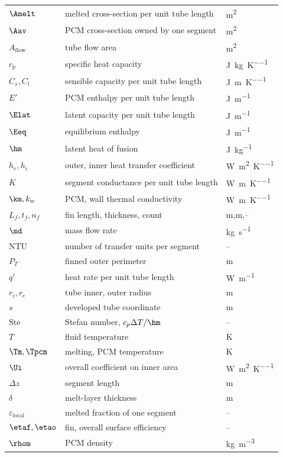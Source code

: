 \noindent
\begin{tabular}{@{}l l l@{}}
$\Amelt$ & melted cross-section per unit tube length & \si{\meter\squared} \\
$\Aav$ & PCM cross-section owned by one segment & \si{\meter\squared} \\
$A_{\mathrm{flow}}$ & tube flow area & \si{\meter\squared} \\
$c_{p}$ & specific heat capacity & \si{\joule\per\kilogram\per\kelvin} \\
$C_{s},C_{l}$ & sensible capacity per unit tube length & \si{\joule\per\meter\per\kelvin} \\
$E'$ & PCM enthalpy per unit tube length & \si{\joule\per\meter} \\
$\Elat$ & latent capacity per unit tube length & \si{\joule\per\meter} \\
$\Eeq$ & equilibrium enthalpy & \si{\joule\per\meter} \\
$\hm$ & latent heat of fusion & \si{\joule\per\kilogram} \\
$h_{e},h_{i}$ & outer, inner heat transfer coefficient & \si{\watt\per\meter\squared\per\kelvin} \\
$K$ & segment conductance per unit tube length & \si{\watt\per\meter\per\kelvin} \\
$\km,k_{w}$ & PCM, wall thermal conductivity & \si{\watt\per\meter\per\kelvin} \\
$L_{f},t_{f},n_{f}$ & fin length, thickness, count & \si{\meter},\si{\meter},-- \\
$\md$ & mass flow rate & \si{\kilogram\per\second} \\
$\mathrm{NTU}$ & number of transfer units per segment & -- \\
$P_{T}$ & finned outer perimeter & \si{\meter} \\
$q'$ & heat rate per unit tube length & \si{\watt\per\meter} \\
$r_{i},r_{e}$ & tube inner, outer radius & \si{\meter} \\
$s$ & developed tube coordinate & \si{\meter} \\
$\mathrm{Ste}$ & Stefan number, $c_{p}\Delta T/\hm$ & -- \\
$T$ & fluid temperature & \si{\kelvin} \\
$\Tm,\Tpcm$ & melting, PCM temperature & \si{\kelvin} \\
$\Ui$ & overall coefficient on inner area & \si{\watt\per\meter\squared\per\kelvin} \\
$\Delta z$ & segment length & \si{\meter} \\
$\delta$ & melt-layer thickness & \si{\meter} \\
$\varepsilon_{\mathrm{local}}$ & melted fraction of one segment & -- \\
$\etaf,\etao$ & fin, overall surface efficiency & -- \\
$\rhom$ & PCM density & \si{\kilogram\per\meter\cubed} \\
\end{tabular}

